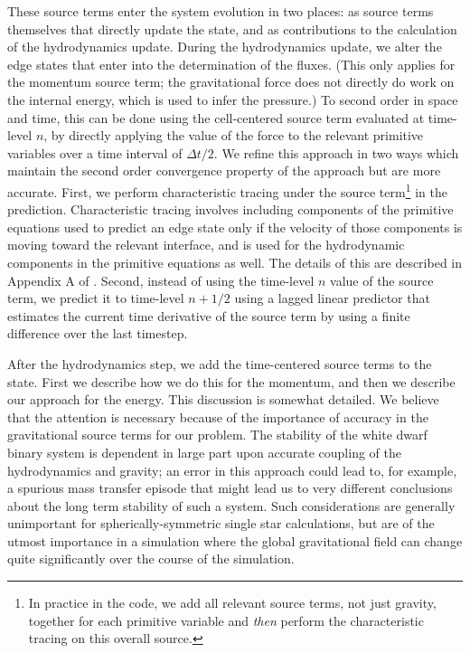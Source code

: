 \documentclass[12pt]{article}
\begin{document}
These source terms enter the system evolution in two places: as source terms themselves
that directly update the state, and as contributions to the calculation of the hydrodynamics update.
During the hydrodynamics update, we alter the edge states that enter
into the determination of the fluxes. (This only applies for the momentum source term;
the gravitational force does not directly do work on the internal energy, which is used 
to infer the pressure.) To second order in space and time, this can be
done using the cell-centered source term evaluated at time-level $n$, by directly
applying the value of the force to the relevant primitive variables over a
time interval of $\Delta t / 2$. We refine this approach in two ways which maintain
the second order convergence property of the approach but are more accurate. First,
we perform characteristic tracing under the source term\footnote{In practice in the code,
we add all relevant source terms, not just gravity, together for each primitive variable and
\textit{then} perform the characteristic tracing on this overall source.} in the prediction.
Characteristic tracing involves including components of the primitive equations used to predict
an edge state only if the velocity of those components is moving toward the relevant interface,
and is used for the hydrodynamic components in the primitive equations as well.
The details of this are described in Appendix A of \cite{wdmergerI}. Second, instead of using
the time-level $n$ value of the source term, we predict it to time-level $n+1/2$ using a lagged
linear predictor that estimates the current time derivative of the source term by using a
finite difference over the last timestep.

After the hydrodynamics step, we add the time-centered source terms
to the state. First we describe how we do this for the momentum,
and then we describe our approach for the energy. This discussion is somewhat detailed.
We believe that the attention is necessary because of the importance of accuracy
in the gravitational source terms for our problem. The stability of the white dwarf binary
system is dependent in large part upon accurate coupling of the hydrodynamics and gravity;
an error in this approach could lead to, for example, a spurious mass transfer episode
that might lead us to very different conclusions about the long term stability of such a system.
Such considerations are generally unimportant for spherically-symmetric single star calculations,
but are of the utmost importance in a simulation where the global gravitational field can change 
quite significantly over the course of the simulation.
\end{document}
